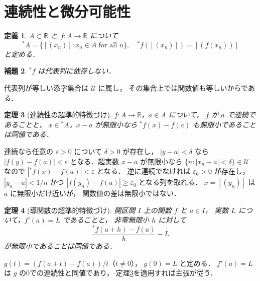 \documentclass[a5paper,10pt,onecolumn]{jsarticle}
\makeatletter
\theoremstyle{mathnotetheorem}
\newtheorem{theorem}{定理}[section]
\newtheorem{definition}[theorem]{定義}
\newtheorem{lemma}[theorem]{補題}
\renewcommand{\proofname}{証明}
\renewenvironment{proof}[1][\proofname]{%
  \par\pushQED{\qed}\normalfont\topsep4\p@\@plus2\p@\relax
  \trivlist\item[\hskip\labelsep\bfseries #1]\ignorespaces
}{\popQED\endtrivlist\@endpefalse}
\makeatother
\begin{document}
\section{連続性と微分可能性}
\begin{definition}
$A\subset\mathbb R$ と $f:A\to\mathbb R$ について
\[
 {}^*A=\{[(x_n)]:x_n\in A\text{ for all }n\},\quad
 {}^*f([(x_n)])=[(f(x_n))]
\]
と定める．
\end{definition}
\begin{lemma}
$ {}^*f$ は代表列に依存しない．
\end{lemma}
\begin{proof}
代表列が等しい添字集合は $\mathcal U$ に属し，
その集合上では関数値も等しいからである．
\end{proof}
\begin{theorem}[連続性の超準的特徴づけ]\label{thm:cont}
$f:A\to\mathbb R$，$a\in A$ について，
$f$ が $a$ で連続であることと，
$x\in{}^*A$，$x-a$ が無限小なら
$ {}^*f(x)-f(a)$ も無限小であることは同値である．
\end{theorem}
\begin{proof}
連続なら任意の $\varepsilon>0$ について
$\delta>0$ が存在し，
$|y-a|<\delta$ なら $|f(y)-f(a)|<\varepsilon$
となる．超実数 $x-a$ が無限小なら
$\{n:|x_n-a|<\delta\}\in\mathcal U$ なので
$|{}^*f(x)-f(a)|<\varepsilon$ となる．
逆に連続でなければ $\varepsilon_0>0$ が存在し，
$|y_n-a|<1/n$ かつ
$|f(y_n)-f(a)|\ge\varepsilon_0$ となる列を取れる．
$x=[(y_n)]$ は $a$ に無限小だけ近いが，
関数値の差は無限小ではない．
\end{proof}
\begin{theorem}[導関数の超準的特徴づけ]\label{thm:derivative}
開区間 $I$ 上の関数 $f$ と $a\in I$，
実数 $L$ について，$f'(a)=L$ であることと，
非零無限小 $h$ に対して
\[
 \frac{{}^*f(a+h)-f(a)}h-L
\]
が無限小であることは同値である．
\end{theorem}
\begin{proof}
$g(t)=(f(a+t)-f(a))/t$（$t\ne0$），
$g(0)=L$ と定める．
$f'(a)=L$ は $g$ の0での連続性と同値であり，
定理\ref{thm:cont}を適用すれば主張が従う．
\end{proof}
\end{document}
